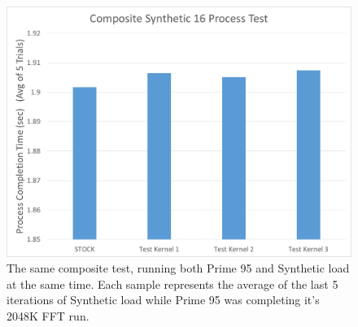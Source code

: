 \begin{figure}[hb]
	\includegraphics[width=1.0\columnwidth]{images/CompositeSynthetic}
	\caption{The same composite test, running both Prime 95 and Synthetic load at the same time. Each sample represents the average of the last 5 iterations of Synthetic load while Prime 95 was completing it's 2048K FFT run.}
\end{figure}

\vspace{20pc}
